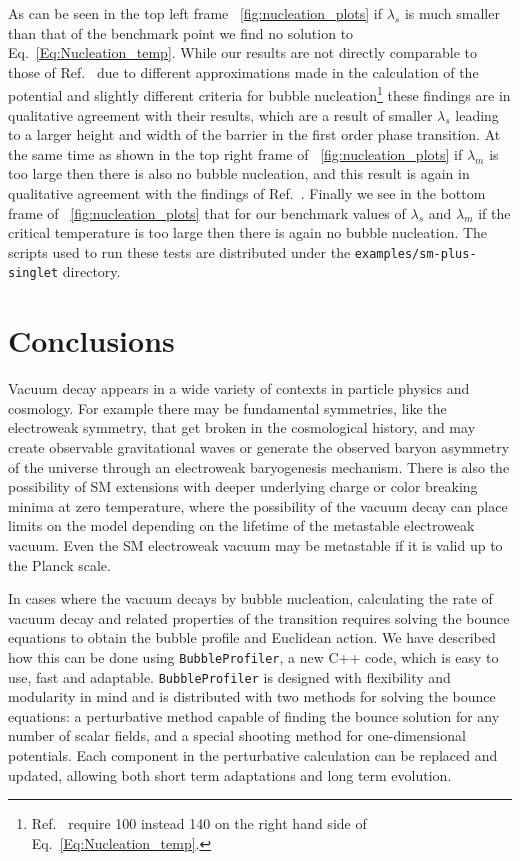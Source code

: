 \documentclass[final,3p,11pt,pdflatex]{elsarticle}
\makeatletter
\newcommand{\bp}{\texttt{BubbleProfiler}\@\xspace}
\newcommand{\code}[1]{\ifmmode\text{\nolinkurl{#1}}\else\nolinkurl{#1}\fi}
\newcommand{\figref}[1]{\figurename~\ref{#1}}
\renewcommand{\refeq}[1]{Eq.~\ref{#1}}
\newcommand{\refcite}[1]{Ref.~\cite{#1}}
\makeatother
\begin{document}
As can be seen in the top left frame \figref{fig:nucleation_plots} if
$\lambda_s$ is much smaller than that of the benchmark point we find
no solution to \refeq{Eq:Nucleation_temp}.  While our results are not
directly comparable to those of
\refcite{KurupDynamicselectroweakphase2017} due to different
approximations made in the calculation of the potential and slightly
different criteria for bubble
nucleation\footnote{\refcite{KurupDynamicselectroweakphase2017}
  require 100 instead 140 on the right hand side of
  \refeq{Eq:Nucleation_temp}.} these findings are in qualitative
agreement with their results, which are a result of smaller
$\lambda_s$ leading to a larger height and width of the barrier in the
first order phase transition. At the same time as shown in the top
right frame of \figref{fig:nucleation_plots} if $\lambda_m$ is too
large then there is also no bubble nucleation, and this result is
again in qualitative agreement with the findings of
\refcite{KurupDynamicselectroweakphase2017}.  Finally we see in the
bottom frame of \figref{fig:nucleation_plots} that for our benchmark
values of $\lambda_s$ and $\lambda_m$ if the critical temperature is
too large then there is again no bubble nucleation.  The scripts used
to run these tests are distributed under the
\code{examples/sm-plus-singlet} directory.

\section{Conclusions}

Vacuum decay appears in a wide variety of contexts in particle physics
and cosmology. For example there may be fundamental symmetries, like
the electroweak symmetry, that get broken in the cosmological history,
and may create observable gravitational waves or generate the observed
baryon asymmetry of the universe through an electroweak baryogenesis
mechanism. There is also the possibility of SM extensions with deeper
underlying charge or color breaking minima at zero temperature, where
the possibility of the vacuum decay can place limits on the model
depending on the lifetime of the metastable electroweak vacuum. 
Even the SM electroweak vacuum may be metastable if it is valid up to the
Planck scale.

In cases where the vacuum decays by bubble nucleation, calculating the rate of vacuum decay and related properties of the transition requires solving the bounce equations to obtain the bubble profile and Euclidean action.
We have described how this can
be done using \bp, a new C++ code, which is easy to use, fast and
adaptable. \bp is designed with flexibility and modularity in mind and is distributed
with two methods for solving the bounce equations: a perturbative method
capable of finding the bounce solution for any number of scalar
fields, and a special shooting method for one-dimensional potentials.
Each component in the perturbative calculation can be replaced and
updated, allowing both short term adaptations and long term evolution.
\end{document}
